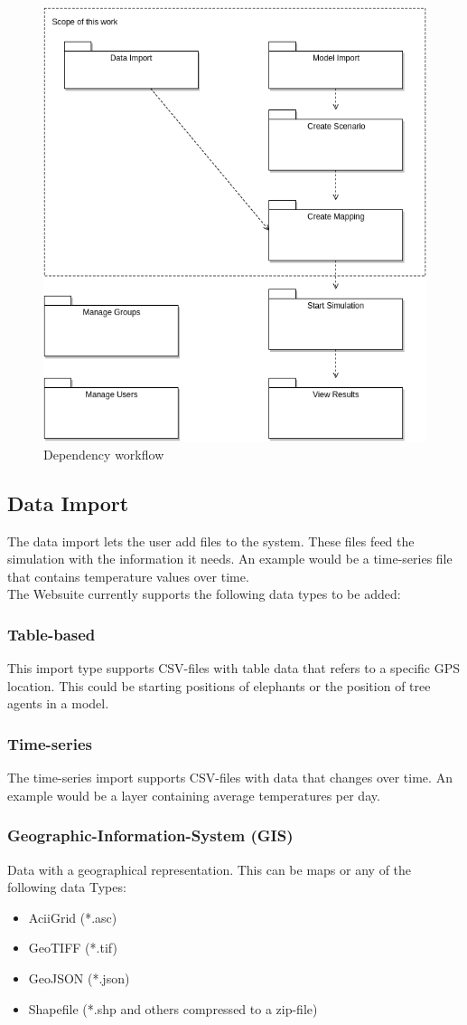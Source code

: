\begin{figure}[H]
	\centering\includegraphics[width=.7\textwidth]{res/Dependency-workflow}
	\caption{Dependency workflow}
	\label{fig:dependency-workflow}
\end{figure}


\subsection{Data Import}
The data import lets the user add files to the system. These files feed the simulation with the information it needs. An example would be a time-series file that contains temperature values over time.\\
The Websuite currently supports the following data types to be added:

\subsubsection{Table-based}
This import type supports CSV-files with table data that refers to a specific GPS location. This could be starting positions of elephants or the position of tree agents in a model.

\subsubsection{Time-series}
The time-series import supports CSV-files with data that changes over time. An example would be a layer containing average temperatures per day.

\subsubsection{Geographic-Information-System (GIS)}
Data with a geographical representation. This can be maps or any of the following data Types:
\begin{itemize}
	\item AciiGrid (*.asc)
	\item GeoTIFF (*.tif)
	\item GeoJSON (*.json)
	\item Shapefile (*.shp and others compressed to a zip-file)
\end{itemize}

